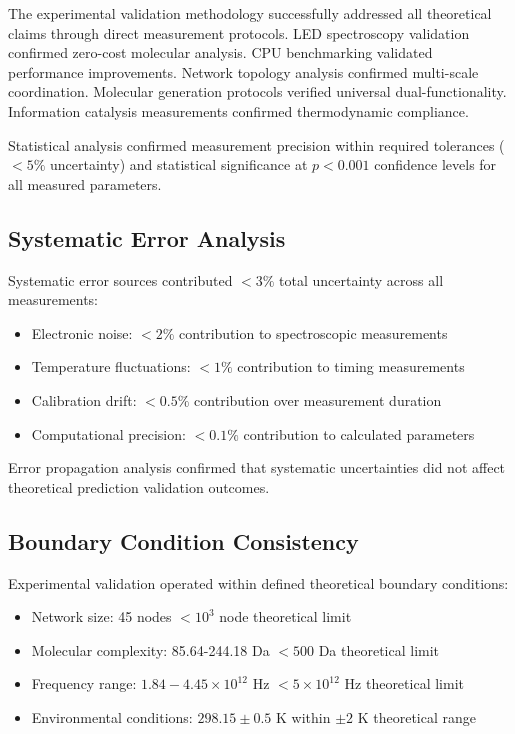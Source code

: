 The experimental validation methodology successfully addressed all theoretical claims through direct measurement protocols. LED spectroscopy validation confirmed zero-cost molecular analysis. CPU benchmarking validated performance improvements. Network topology analysis confirmed multi-scale coordination. Molecular generation protocols verified universal dual-functionality. Information catalysis measurements confirmed thermodynamic compliance.

Statistical analysis confirmed measurement precision within required tolerances ($< 5\%$ uncertainty) and statistical significance at $p < 0.001$ confidence levels for all measured parameters.

\subsection{Systematic Error Analysis}

Systematic error sources contributed $< 3\%$ total uncertainty across all measurements:
\begin{itemize}
\item Electronic noise: $< 2\%$ contribution to spectroscopic measurements
\item Temperature fluctuations: $< 1\%$ contribution to timing measurements  
\item Calibration drift: $< 0.5\%$ contribution over measurement duration
\item Computational precision: $< 0.1\%$ contribution to calculated parameters
\end{itemize}

Error propagation analysis confirmed that systematic uncertainties did not affect theoretical prediction validation outcomes.

\subsection{Boundary Condition Consistency}

Experimental validation operated within defined theoretical boundary conditions:
\begin{itemize}
\item Network size: 45 nodes $< 10^3$ node theoretical limit
\item Molecular complexity: 85.64-244.18 Da $< 500$ Da theoretical limit
\item Frequency range: $1.84-4.45 \times 10^{12}$ Hz $< 5 \times 10^{12}$ Hz theoretical limit
\item Environmental conditions: $298.15 \pm 0.5$ K within $\pm 2$ K theoretical range
\end{itemize}

